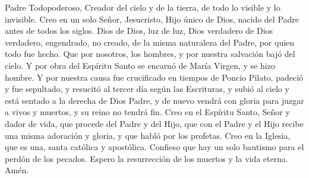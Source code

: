 Padre Todopoderoso, Creador del cielo y de la tierra, de todo lo visible y lo invisible. 
Creo en un solo Señor, Jesucristo, Hijo único de Dios, nacido del Padre antes de todos los siglos. Dios de Dios, luz de luz, 
Dios verdadero de Dios verdadero, engendrado, no creado, de la misma naturaleza del Padre, por quien todo fue hecho. Que por nosotros, los hombres, 
y por nuestra salvación bajó del cielo. Y por obra del Espíritu Santo se encarnó de María Virgen, y se hizo hombre. 
Y por nuestra causa fue crucificado en tiempos de Poncio Pilato, padeció y fue sepultado, y resucitó al tercer día según las Escrituras, 
y subió al cielo y está sentado a la derecha de Dios Padre, y de nuevo vendrá con gloria para juzgar a vivos y muertos, y su reino no tendrá fin. 
Creo en el Espíritu Santo, Señor y dador de vida, que procede del Padre y del Hijo, que con el Padre y el Hijo recibe una misma adoración y gloria, 
y que habló por los profetas. Creo en la Iglesia, que es una, santa católica y apostólica. Confieso que hay un solo bautismo para el perdón de los pecados. 
Espero la resurrección de los muertos y la vida eterna. Amén.